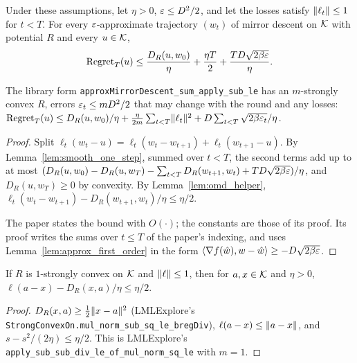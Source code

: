 \begin{theorem}
  \label{thm:ub_smooth}
  \leanok
  Under these assumptions, let $\eta > 0$, $\varepsilon \le D^2/2$, and let the losses satisfy
  $\lVert \ell_t \rVert \le 1$ for $t < T$. For every $\varepsilon$-approximate trajectory $(w_t)$ of mirror
  descent on $\mathcal{K}$ with potential $R$ and every $u \in \mathcal{K}$,
  \[ \mathrm{Regret}_T(u) \le \frac{D_R(u, w_0)}{\eta} + \frac{\eta T}{2}
    + \frac{T D \sqrt{2 \beta \varepsilon}}{\eta}. \]

  The library form \texttt{approxMirrorDescent\_sum\_apply\_sub\_le} has an $m$-strongly convex
  $R$, errors $\varepsilon_t \le m D^2 / 2$ that may change with the round and any losses:
  $\mathrm{Regret}_T(u) \le D_R(u, w_0)/\eta + \frac{\eta}{2m}\sum_{t<T}\lVert \ell_t \rVert^2 +
  D \sum_{t<T}\sqrt{2\beta\varepsilon_t}/\eta$.
\end{theorem}

\begin{proof}
  \leanok
  Split $\ell_t(w_t - u) = \ell_t(w_t - w_{t+1}) + \ell_t(w_{t+1} - u)$. By
  Lemma~\ref{lem:smooth_one_step}, summed over $t < T$, the second terms add up to at most
  $(D_R(u, w_0) - D_R(u, w_T) - \sum_{t<T} D_R(w_{t+1}, w_t) + T D \sqrt{2\beta\varepsilon}) / \eta$, and
  $D_R(u, w_T) \ge 0$ by convexity. By Lemma~\ref{lem:omd_helper},
  $\ell_t(w_t - w_{t+1}) - D_R(w_{t+1}, w_t)/\eta \le \eta/2$.

  The paper states the bound with $O(\cdot)$; the constants are those of its proof. Its proof
  writes the sums over $t \le T$ of the paper's indexing, and uses Lemma~\ref{lem:approx_first_order}
  in the form $\langle \nabla f(\hat w), w - \hat w \rangle \ge -D\sqrt{2\beta\varepsilon}$.
\end{proof}

\begin{lemma}
  \label{lem:omd_helper}
  \leanok
  If $R$ is $1$-strongly convex on $\mathcal{K}$ and $\lVert \ell \rVert \le 1$, then for $a, x \in \mathcal{K}$ and
  $\eta > 0$, $\ell(a - x) - D_R(x, a)/\eta \le \eta / 2$.
\end{lemma}

\begin{proof}
  \leanok
  $D_R(x, a) \ge \frac12 \lVert x - a \rVert^2$ (LMLExplore's
  \texttt{StrongConvexOn.mul\_norm\_sub\_sq\_le\_bregDiv}), $\ell(a - x) \le \lVert a - x \rVert$, and
  $s - s^2/(2\eta) \le \eta/2$. This is LMLExplore's
  \texttt{apply\_sub\_sub\_div\_le\_of\_mul\_norm\_sq\_le} with $m = 1$.
\end{proof}

